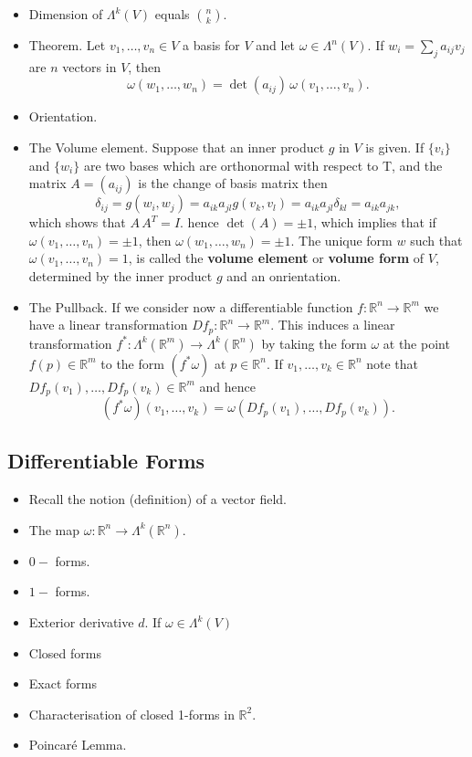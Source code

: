 \documentclass{amsart}
\begin{document}
\begin{itemize}
\begin{itemize}
\end{itemize}
\item Dimension of \(\Lambda^k(V)\) equals \({n\choose k}\).
\item Theorem. Let \(v_1,\ldots, v_n\in V\) a basis for \(V\) and let \(\omega \in \Lambda^n(V)\). If \(w_i = \sum_{j}a_{ij}v_j\) are \(n\) vectors in \(V\), then \[ \omega(w_1, \ldots, w_n) = \det(a_{ij}) \, \omega(v_1,\ldots,v_n).\]
\item Orientation.
\item The Volume element. Suppose that an inner product \(g\) in \(V\) is given. If \(\{v_i\}\) and \(\{w_i\}\) are two bases which are orthonormal with respect to T, and the matrix \(A = (a_{ij})\) is the change of basis matrix then \[ \delta_{ij} = g(w_i,w_j) = a_{ik}a_{jl}g(v_k,v_l) = a_{ik}a_{jl}\delta_{kl} = a_{ik}a_{jk}, \] which shows that \(A\,A^T = I\). hence \(\det(A) = \pm 1\), which implies that if \(\omega(v_1,\ldots,v_n) = \pm 1\), then \(\omega(w_1,\ldots,w_n) = \pm 1\). The unique form \(w\) such that \(\omega(v_1,\ldots,v_n) = 1\), is called the \textbf{volume element} or \textbf{volume form} of \(V\), determined by the inner product \(g\) and an onrientation.
\item The Pullback. If we consider now a differentiable function \(f: \mathbb{R}^n\to\mathbb{R}^m\) we have a linear transformation \(Df_p: \mathbb{R}^n \to \mathbb{R}^m\). This induces a linear transformation \(f^*:\Lambda^k(\mathbb{R}^m) \to \Lambda^k(\mathbb{R}^{n})\) by taking the form \(\omega\) at the point \(f(p)\in \mathbb{R}^m\) to  the form \((f^*\omega)\) at \(p\in\mathbb{R}^n\). If \(v_1, \ldots, v_k \in \mathbb{R}^n\) note that \(Df_p(v_1), \ldots, Df_p(v_k) \in \mathbb{R}^m\) and hence \[ (f^*\omega)(v_1,\ldots,v_k) = \omega(Df_p(v_1),\ldots,Df_p(v_k)).\]
\end{itemize}

\subsection{Differentiable Forms}
\label{sec:org1d5d40a}
\begin{itemize}
\item Recall the notion (definition) of a vector field.
\item The map \(\omega : \mathbb{R}^n \to \Lambda^k(\mathbb{R}^n)\).
\item \(0-\) forms.
\item \(1-\) forms.
\item Exterior derivative \(d\). If \(\omega \in \Lambda^{k}(V)\)
\item Closed forms
\item Exact forms
\item Characterisation of closed 1-forms in \(\mathbb{R}^2\).
\item Poincaré Lemma.
\end{itemize}
\end{document}
